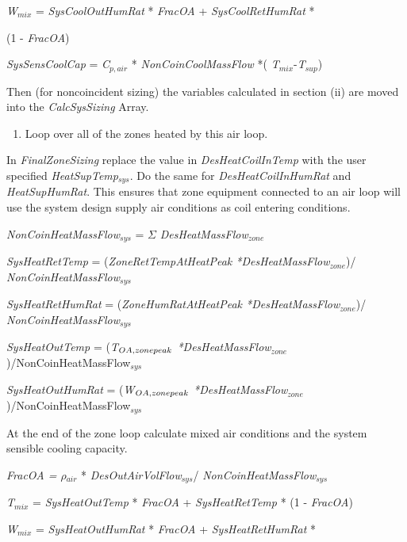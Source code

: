 \emph{W\(_{mix}\)} = \emph{SysCoolOutHumRat} * \emph{FracOA} + \emph{SysCoolRetHumRat} *

(1 - \emph{FracOA})

\emph{SysSensCoolCap} = \emph{C\(_{p,air}\)} * \emph{NonCoinCoolMassFlow} *( \emph{T\(_{mix}\)}-\emph{T\(_{sup}\)})

Then (for noncoincident sizing) the variables calculated in section (ii) are moved into the \emph{CalcSysSizing} Array.

\begin{enumerate}
\def\labelenumi{(\alph{enumi})}
\setcounter{enumi}{2}
\item Loop over all of the zones heated by this air loop.
\end{enumerate}

In \emph{FinalZoneSizing} replace the value in \emph{DesHeatCoilInTemp} with the user specified \emph{HeatSupTemp\(_{sys}\)}. Do the same for \emph{DesHeatCoilInHumRat} and \emph{HeatSupHumRat}. This ensures that zone equipment connected to an air loop will use the system design supply air conditions as coil entering conditions.

\emph{NonCoinHeatMassFlow\(_{sys}\)} = $\Sigma$ \emph{DesHeatMassFlow\(_{zone}\)}

\emph{SysHeatRetTemp} = (\emph{ZoneRetTempAtHeatPeak *}\emph{DesHeatMassFlow\(_{zone}\)})/
\emph{NonCoinHeatMassFlow\(_{sys}\)}

\emph{SysHeatRetHumRat} = (\emph{ZoneHumRatAtHeatPeak *}\emph{DesHeatMassFlow\(_{zone}\)})/
\emph{NonCoinHeatMassFlow\(_{sys}\)}

\emph{SysHeatOutTemp} = (\emph{T\(_{OA,zone\\ peak}\) *DesHeatMassFlow\(_{zone}\)})/NonCoinHeatMassFlow\(_{sys}\)

\emph{SysHeatOutHumRat} = (\emph{W\(_{OA,zone\\ peak}\) *DesHeatMassFlow\(_{zone}\)})/NonCoinHeatMassFlow\(_{sys}\)

At the end of the zone loop calculate mixed air conditions and the system sensible cooling capacity.

\emph{FracOA = $\rho$\(_{air}\)} * \emph{DesOutAirVolFlow\(_{sys}\)}/ \emph{NonCoinHeatMassFlow\(_{sys}\)}

\emph{T\(_{mix}\)} = \emph{SysHeatOutTemp} * \emph{FracOA} + \emph{SysHeatRetTemp} * (1 - \emph{FracOA})

\emph{W\(_{mix}\)} = \emph{SysHeatOutHumRat} * \emph{FracOA} + \emph{SysHeatRetHumRat} *

